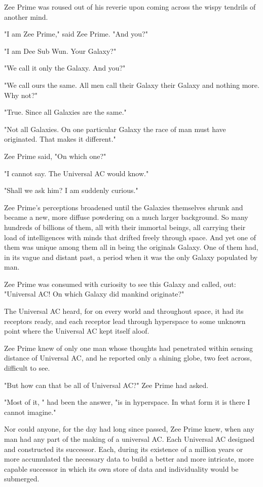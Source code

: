 \documentclass[11pt]{article}
\begin{document}
Zee Prime was roused out of his reverie upon coming across the wispy tendrils of another mind.

"I am Zee Prime," said Zee Prime. "And you?"

"I am Dee Sub Wun. Your Galaxy?"

"We call it only the Galaxy. And you?"

"We call ours the same. All men call their Galaxy their Galaxy and nothing more. Why not?"

"True. Since all Galaxies are the same."

"Not all Galaxies. On one particular Galaxy the race of man must have originated. That makes it different."

Zee Prime said, "On which one?"

"I cannot say. The Universal AC would know."

"Shall we ask him? I am suddenly curious."

Zee Prime's perceptions broadened until the Galaxies themselves shrunk and became a new, more diffuse powdering on a much larger background. So many hundreds of billions of them, all with their immortal beings, all carrying their load of intelligences with minds that drifted freely through space. And yet one of them was unique among them all in being the originals Galaxy. One of them had, in its vague and distant past, a period when it was the only Galaxy populated by man.

Zee Prime was consumed with curiosity to see this Galaxy and called, out: "Universal AC! On which Galaxy did mankind originate?"

The Universal AC heard, for on every world and throughout space, it had its receptors ready, and each receptor lead through hyperspace to some unknown point where the Universal AC kept itself aloof.

Zee Prime knew of only one man whose thoughts had penetrated within sensing distance of Universal AC, and he reported only a shining globe, two feet across, difficult to see.

"But how can that be all of Universal AC?" Zee Prime had asked.

"Most of it, " had been the answer, "is in hyperspace. In what form it is there I cannot imagine."

Nor could anyone, for the day had long since passed, Zee Prime knew, when any man had any part of the making of a universal AC. Each Universal AC designed and constructed its successor. Each, during its existence of a million years or more accumulated the necessary data to build a better and more intricate, more capable successor in which its own store of data and individuality would be submerged.
\end{document}
